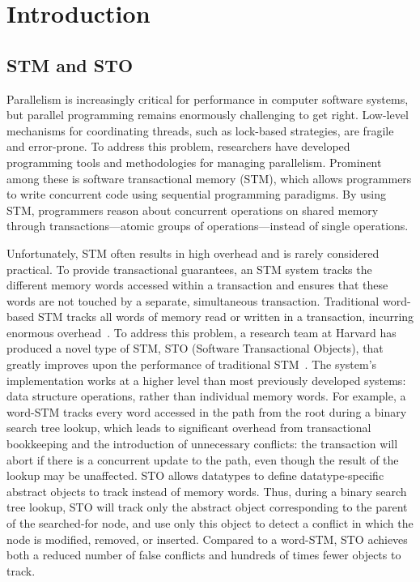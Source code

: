 \chapter{Introduction}
\section{STM and STO}
Parallelism is increasingly critical for performance in computer software systems, but parallel programming remains enormously challenging to get right. Low-level mechanisms for coordinating threads, such as lock-based strategies, are fragile and error-prone. To address this problem, researchers have developed programming tools and methodologies for managing parallelism. Prominent among these is software transactional memory (STM), which allows programmers to write concurrent code using sequential programming paradigms. By using STM, programmers reason about concurrent operations on shared memory through transactions---atomic groups of operations---instead of single operations. 

Unfortunately, STM often results in high overhead and is rarely considered practical. To provide transactional guarantees, an STM system tracks the different memory words accessed within a transaction and ensures that these words are not touched by a separate, simultaneous transaction. Traditional word-based STM tracks all words of memory read or written in a transaction, incurring enormous overhead~\cite{cascaval}. To address this problem, a research team at Harvard has produced a novel type of STM, STO (Software Transactional Objects), that greatly improves upon the performance of traditional STM~\cite{sto}. The system's implementation works at a higher level than most previously developed systems: data structure operations, rather than individual memory words. For example, a word-STM tracks every word accessed in the path from the root during a binary search tree lookup, which leads to significant overhead from transactional bookkeeping and the introduction of unnecessary conflicts: the transaction will abort if there is a concurrent update to the path, even though the result of the lookup may be unaffected. STO allows datatypes to define datatype-specific abstract objects to track instead of memory words. Thus, during a binary search tree lookup, STO will track only the abstract object corresponding to the parent of the searched-for node, and use only this object to detect a conflict in which the node is modified, removed, or inserted. Compared to a word-STM, STO achieves both a reduced number of false conflicts and hundreds of times fewer objects to track.

